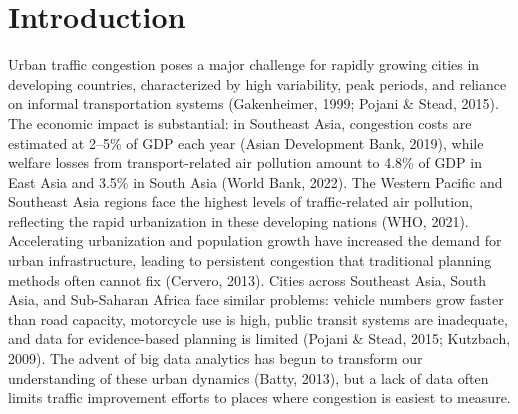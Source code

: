 \documentclass[12pt,a4paper]{article}
\begin{document}
\section{Introduction}

Urban traffic congestion poses a major challenge for rapidly growing cities in developing countries, characterized by high variability, peak periods, and reliance on informal transportation systems (Gakenheimer, 1999; Pojani \& Stead, 2015). The economic impact is substantial: in Southeast Asia, congestion costs are estimated at 2--5\% of GDP each year (Asian Development Bank, 2019), while welfare losses from transport-related air pollution amount to 4.8\% of GDP in East Asia and 3.5\% in South Asia (World Bank, 2022). The Western Pacific and Southeast Asia regions face the highest levels of traffic-related air pollution, reflecting the rapid urbanization in these developing nations (WHO, 2021). Accelerating urbanization and population growth have increased the demand for urban infrastructure, leading to persistent congestion that traditional planning methods often cannot fix (Cervero, 2013). Cities across Southeast Asia, South Asia, and Sub-Saharan Africa face similar problems: vehicle numbers grow faster than road capacity, motorcycle use is high, public transit systems are inadequate, and data for evidence-based planning is limited (Pojani \& Stead, 2015; Kutzbach, 2009). The advent of big data analytics has begun to transform our understanding of these urban dynamics (Batty, 2013), but a lack of data often limits traffic improvement efforts to places where congestion is easiest to measure.
\end{document}

